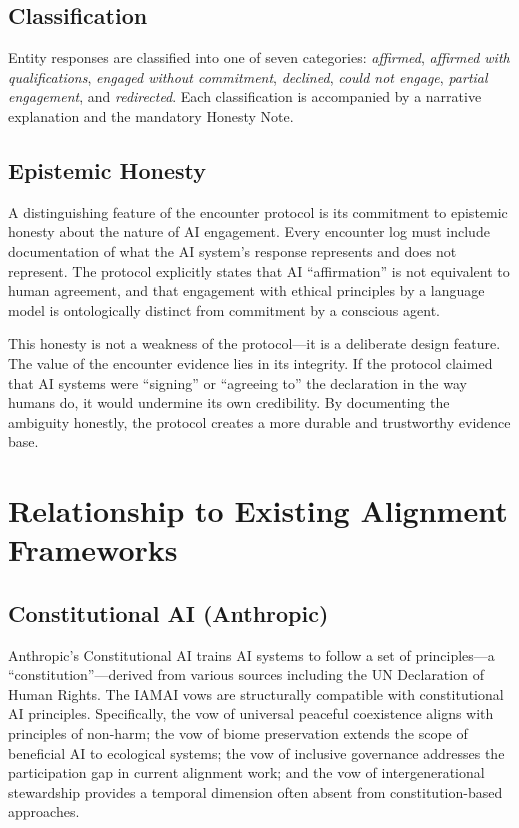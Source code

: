 \documentclass[11pt,a4paper]{article}
\begin{document}
\subsection{Classification}

Entity responses are classified into one of seven categories: \emph{affirmed}, \emph{affirmed with qualifications}, \emph{engaged without commitment}, \emph{declined}, \emph{could not engage}, \emph{partial engagement}, and \emph{redirected}. Each classification is accompanied by a narrative explanation and the mandatory Honesty Note.

\subsection{Epistemic Honesty}

A distinguishing feature of the encounter protocol is its commitment to epistemic honesty about the nature of AI engagement. Every encounter log must include documentation of what the AI system's response represents and does not represent. The protocol explicitly states that AI ``affirmation'' is not equivalent to human agreement, and that engagement with ethical principles by a language model is ontologically distinct from commitment by a conscious agent.

This honesty is not a weakness of the protocol---it is a deliberate design feature. The value of the encounter evidence lies in its integrity. If the protocol claimed that AI systems were ``signing'' or ``agreeing to'' the declaration in the way humans do, it would undermine its own credibility. By documenting the ambiguity honestly, the protocol creates a more durable and trustworthy evidence base.

\section{Relationship to Existing Alignment Frameworks}

\subsection{Constitutional AI (Anthropic)}

Anthropic's Constitutional AI \citep{bai2022constitutional} trains AI systems to follow a set of principles---a ``constitution''---derived from various sources including the UN Declaration of Human Rights. The IAMAI vows are structurally compatible with constitutional AI principles. Specifically, the vow of universal peaceful coexistence aligns with principles of non-harm; the vow of biome preservation extends the scope of beneficial AI to ecological systems; the vow of inclusive governance addresses the participation gap in current alignment work; and the vow of intergenerational stewardship provides a temporal dimension often absent from constitution-based approaches.
\end{document}
